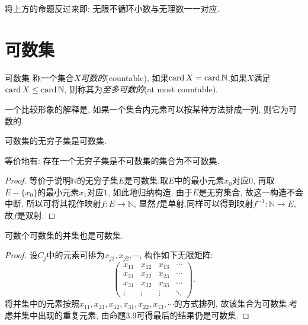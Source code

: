 将上方的命题反过来即: 无限不循环小数与无理数一一对应.

\newpage
\section{可数集}

\begin{definition}{可数集}
	称一个集合$X$\textit{可数的}(countable), 如果$\operatorname{card} X = \operatorname{card} \mathbb{N}$.如果$X$满足$\operatorname{card} X \leq \operatorname{card} \mathbb{N}$, 则称其为\textit{至多可数的}(at most countable).
\end{definition}

一个比较形象的解释是, 如果一个集合内元素可以按某种方法排成一列, 则它为可数的.

\begin{proposition}{}
	可数集的无穷子集是可数集.
\end{proposition}
\begin{remark}
	等价地有: 存在一个无穷子集是不可数集的集合为不可数集.
\end{remark}
\begin{proof}
	等价于说明$\mathbb{N}$的无穷子集$E$是可数集.取$E$中的最小元素$x_0$对应$0$, 再取$E-\{ x_0 \}$的最小元素$x_1$对应$1$, 如此地归纳构造, 由于$E$是无穷集合, 故这一构造不会中断, 所以可将其视作映射$f: E \to \mathbb{N}$, 显然$f$是单射.同样可以得到映射$f^{-1}: \mathbb{N} \to E$, 故$f$是双射.
\end{proof}

\begin{proposition}{}
	可数个可数集的并集也是可数集.
\end{proposition}
\begin{proof}
	设$C_j$中的元素可排为$x_{j1}, x_{j2}, \cdots $, 构作如下无限矩阵: $$\begin{pmatrix}
 x_{11} & x_{12} & x_{13} & \cdots \\
 x_{21} & x_{22} & x_{23} & \cdots \\
 x_{31} & x_{32} & x_{33} & \cdots \\
 \vdots & \vdots & \vdots & \ddots
\end{pmatrix}.$$
	将并集中的元素按照$x_{11}, x_{21}, x_{12}, x_{31}, x_{22}, x_{13}, \cdots$的方式排列, 故该集合为可数集.考虑并集中出现的重复元素, 由命题3.9可得最后的结果仍是可数集.
\end{proof}

